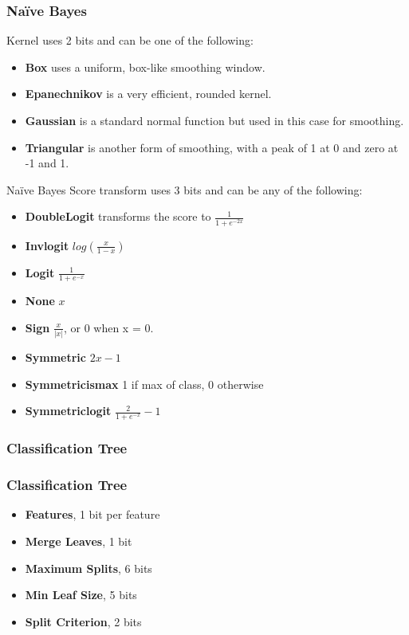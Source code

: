 \documentclass{beamer}
\begin{document}
\begin{frame}
	\frametitle{Na\"ive Bayes}
	Kernel uses 2 bits and can be one of the following: 
	\begin{itemize}
		\item \textbf{Box} uses a uniform, box-like smoothing window.
		\item \textbf{Epanechnikov} is a very efficient, rounded kernel.
		\item \textbf{Gaussian} is a standard normal function but used in this case for smoothing.
		\item \textbf{Triangular} is another form of smoothing, with a peak of 1 at 0 and zero at -1 and 1.
	\end{itemize}
\end{frame}
\begin{frame}{Na\"ive Bayes}
	Score transform uses 3 bits and can be any of the following:
\begin{itemize}
	\item \textbf{DoubleLogit} transforms the score to $\frac{1}{1+e^{-2x}}$
	\item \textbf{Invlogit} $log(\frac{x}{1-x})$
	\item \textbf{Logit} $\frac{1}{1+e^{-x}}$
	\item \textbf{None} $x$
	\item \textbf{Sign} $\frac{x}{|x|}$, or 0 when x = 0.
	\item \textbf{Symmetric} $2x-1$
	\item \textbf{Symmetricismax} 1 if max of class, 0 otherwise
	\item \textbf{Symmetriclogit} $\frac{2}{1+e^{-x}}-1$
\end{itemize}
\end{frame}

\subsubsection{Classification Tree}
	
\begin{frame}
	\frametitle{Classification Tree}
	  \begin{itemize}
	  	\item \textbf{Features}, 1 bit per feature
		\item \textbf{Merge Leaves},  1 bit
		\item \textbf{Maximum Splits}, 6 bits
		\item \textbf{Min Leaf Size}, 5 bits
		\item \textbf{Split Criterion}, 2 bits
	\end{itemize}
\end{frame}
\end{document}
